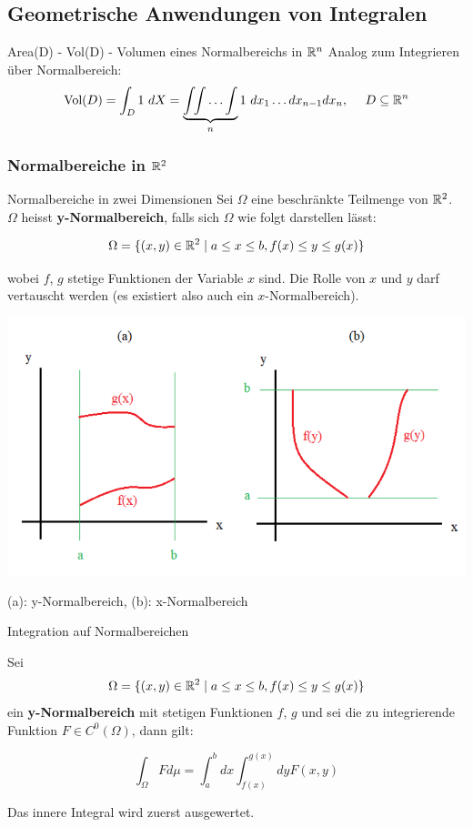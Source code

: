 
\subsection{Geometrische Anwendungen von Integralen}

\begin{Rezept}{Area(D) - Vol(D) - Volumen eines Normalbereichs in $\mathbb{R}^n$}{}
Analog zum Integrieren über Normalbereich:
\[ \text{Vol}(D) = \int_D 1 ~ dX = \underbrace{\int \!\! \int \ldots \int}_{n} 1 ~ dx_1 \ldots dx_{n-1} dx_n,  ~~~~ D \subseteq \mathbb{R}^n\]
\end{Rezept}

\subsubsection{Normalbereiche in $\mathbb{R}^2$}

\begin{Definition}{Normalbereiche in zwei Dimensionen}{}
Sei $\Omega$ eine beschränkte Teilmenge von $\mathbb{R}^2$. $\Omega$ heisst \textbf{y-Normalbereich}, falls sich $\Omega$ wie folgt darstellen lässt:

\[
    \Omega = \{(x, y) \in \mathbb{R}^2 \mid a \leq x \leq b, f(x) \leq y \leq g(x)\}
\]

wobei $f$, $g$ stetige Funktionen der Variable $x$ sind. Die Rolle von $x$ und $y$ darf vertauscht werden (es existiert also auch ein $x$-Normalbereich).

\includegraphics[width=.7\textwidth]{images/normalbereich}

(a): y-Normalbereich, (b): x-Normalbereich

\end{Definition}
\begin{Satz}{Integration auf Normalbereichen}{}

Sei \[\Omega = \{(x, y) \in \mathbb{R}^2 \mid a \leq x \leq b, f(x) \leq y \leq g(x)\}\] ein \textbf{y-Normalbereich} mit stetigen Funktionen $f$, $g$ und sei die zu integrierende Funktion $F \in C^0(\Omega)$, dann gilt:

\[
    \int_{\Omega} F d\mu = \int_a^b dx \int_{f(x)}^{g(x)} dy F(x, y)
\]

Das innere Integral wird zuerst ausgewertet.
\end{Satz}

